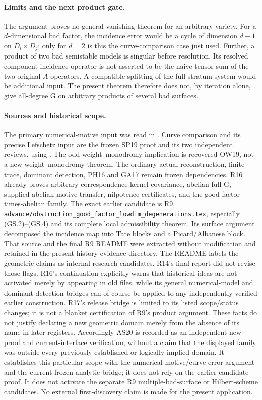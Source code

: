 \paragraph{Limits and the next product gate.}
The argument proves no general vanishing theorem for an arbitrary
variety.  For a $d$-dimensional bad factor, the incidence error would
be a cycle of dimension $d-1$ on $D_i\times D_j$; only for $d=2$
is this the curve-comparison case just used.  Further, a product of
two bad semistable models is singular before resolution.  Its
resolved component incidence operator is not asserted to be the
naive tensor sum of the two original $A$ operators.  A compatible
splitting of the full stratum system would be additional input.
The present theorem therefore does not, by iteration alone, give
all-degree G on arbitrary products of several bad surfaces.

\paragraph{Sources and historical scope.}
The primary numerical-motive input was read in
\cite[Theorem~1]{AS20Jannsen}.  Curve comparison and its precise
Lefschetz input are the frozen SP19 proof and its two independent
reviews, using \cite[Proposition~4.3]{AS20Kleiman}.  The odd
weight--monodromy implication is recovered OW19, not a new
weight--monodromy theorem.  The ordinary-actual reconstruction,
finite trace, dominant detection, PH16 and GA17 remain frozen
dependencies.  R16 already proves arbitrary correspondence-kernel
covariance, abelian full G, supplied abelian-motive transfer,
nilpotence certificates, and the good-factor-times-abelian family.
The exact earlier candidate is R9,
\texttt{advance/obstruction\_good\_factor\_lowdim\_degenerations.tex},
especially (GS.2)--(GS.4) and its complete local admissibility theorem.
Its surface argument decomposed the incidence map into Tate blocks
and a Picard/Albanese block.  That source and the final R9 README
were extracted without modification and retained in the present
history-evidence directory.  The README labels the geometric claims
as internal research candidates.  R14's final report did not revise
those flags.  R16's continuation explicitly warns that historical
ideas are not activated merely by appearing in old files, while its
general numerical-model and dominant-detection bridges can of course
be applied to any independently verified earlier construction.
R17's release bridge is limited to its listed scope/status changes;
it is not a blanket certification of R9's product argument.
These facts do not justify declaring a new geometric domain merely
from the absence of its name in later registers.  Accordingly AS20
is recorded as an independent new proof and current-interface
verification, without a claim that the displayed family was outside
every previously established or logically implied domain.
It establishes this particular scope with the numerical-motive/curve-error
argument and the current frozen analytic bridge; it does not rely
on the earlier candidate proof.  It does not activate the separate
R9 multiple-bad-surface or Hilbert-scheme candidates.  No external
first-discovery claim is made for the present application.

